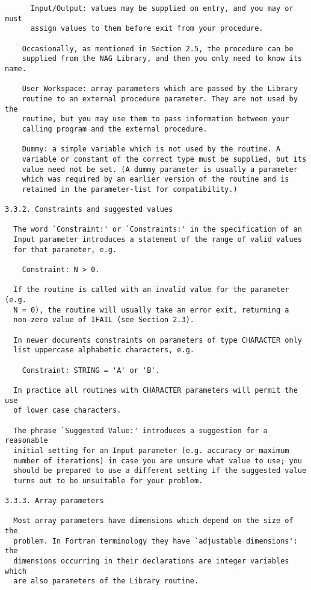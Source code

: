 \begin{verbatim}
      Input/Output: values may be supplied on entry, and you may or must
      assign values to them before exit from your procedure.
 
    Occasionally, as mentioned in Section 2.5, the procedure can be
    supplied from the NAG Library, and then you only need to know its name.
 
    User Workspace: array parameters which are passed by the Library
    routine to an external procedure parameter. They are not used by the
    routine, but you may use them to pass information between your
    calling program and the external procedure.
 
    Dummy: a simple variable which is not used by the routine. A
    variable or constant of the correct type must be supplied, but its
    value need not be set. (A dummy parameter is usually a parameter
    which was required by an earlier version of the routine and is
    retained in the parameter-list for compatibility.)
 
3.3.2. Constraints and suggested values
 
  The word `Constraint:' or `Constraints:' in the specification of an
  Input parameter introduces a statement of the range of valid values
  for that parameter, e.g.
 
    Constraint: N > 0.
 
  If the routine is called with an invalid value for the parameter (e.g.
  N = 0), the routine will usually take an error exit, returning a
  non-zero value of IFAIL (see Section 2.3).
 
  In newer documents constraints on parameters of type CHARACTER only
  list uppercase alphabetic characters, e.g.
 
    Constraint: STRING = 'A' or 'B'.
 
  In practice all routines with CHARACTER parameters will permit the use
  of lower case characters.
 
  The phrase `Suggested Value:' introduces a suggestion for a reasonable
  initial setting for an Input parameter (e.g. accuracy or maximum
  number of iterations) in case you are unsure what value to use; you
  should be prepared to use a different setting if the suggested value
  turns out to be unsuitable for your problem.
 
3.3.3. Array parameters
 
  Most array parameters have dimensions which depend on the size of the
  problem. In Fortran terminology they have `adjustable dimensions': the
  dimensions occurring in their declarations are integer variables which
  are also parameters of the Library routine.
 

\end{verbatim}
